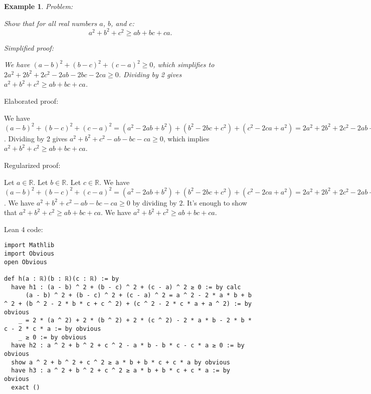 \documentclass{article}
\newtheorem{example}{Example}
\begin{document}
\begin{example}
Problem:
\begin{tcolorbox}[colback=yellow!10, width=\linewidth]
Show that for all real numbers $a$, $b$, and $c$:
    $$a^2 + b^2 + c^2 \geq ab + bc + ca.$$
\end{tcolorbox}

Simplified proof:
\begin{tcolorbox}[colback=blue!10, width=\linewidth]
We have $(a-b)^2 + (b-c)^2 + (c-a)^2 \geq 0$, which simplifies to $2a^2 + 2b^2 + 2c^2 - 2ab - 2bc - 2ca \geq 0$. Dividing by 2 gives $a^2 + b^2 + c^2 \geq ab + bc + ca$.
\end{tcolorbox}
\end{example}

Elaborated proof:
\begin{tcolorbox}[colback=green!10, width=\linewidth]
We have $(a-b)^2 + (b-c)^2 + (c-a)^2 = (a^2 - 2ab + b^2) + (b^2 - 2bc + c^2) + (c^2 - 2ca + a^2) = 2a^2 + 2b^2 + 2c^2 - 2ab - 2bc - 2ca \geq 0$. Dividing by 2 gives $a^2 + b^2 + c^2 - ab - bc - ca \geq 0$, which implies $a^2 + b^2 + c^2 \geq ab + bc + ca$.
\end{tcolorbox}

Regularized proof:
\begin{tcolorbox}[colback=red!10, width=\linewidth]
Let $a\in\mathbb{R}$.
Let $b\in\mathbb{R}$.
Let $c\in\mathbb{R}$.
We have ${{(a-b)}}^2 + {{(b-c)}}^2 + {{(c-a)}}^2 = (a^2 - 2ab + b^2) + (b^2 - 2bc + c^2) + (c^2 - 2ca + a^2) = 2a^2 + 2b^2 + 2c^2 - 2ab - 2bc - 2ca \geq 0$. We have $a^2 + b^2 + c^2 - ab - bc - ca \geq 0$ by dividing by $2$.  It's enough to show that $a^2 + b^2 + c^2 \geq ab + bc + ca$. We have $a^2 + b^2 + c^2 \geq ab + bc + ca$.
\end{tcolorbox}

Lean 4 code:
\begin{tcolorbox}[colback=white!10, width=\linewidth]
\begin{lstlisting}[language=Lean4]
import Mathlib
import Obvious
open Obvious

def h(a : ℝ)(b : ℝ)(c : ℝ) := by
  have h1 : (a - b) ^ 2 + (b - c) ^ 2 + (c - a) ^ 2 ≥ 0 := by calc
      (a - b) ^ 2 + (b - c) ^ 2 + (c - a) ^ 2 = a ^ 2 - 2 * a * b + b ^ 2 + (b ^ 2 - 2 * b * c + c ^ 2) + (c ^ 2 - 2 * c * a + a ^ 2) := by obvious
    _ = 2 * (a ^ 2) + 2 * (b ^ 2) + 2 * (c ^ 2) - 2 * a * b - 2 * b * c - 2 * c * a := by obvious
    _ ≥ 0 := by obvious
  have h2 : a ^ 2 + b ^ 2 + c ^ 2 - a * b - b * c - c * a ≥ 0 := by obvious
  show a ^ 2 + b ^ 2 + c ^ 2 ≥ a * b + b * c + c * a by obvious
  have h3 : a ^ 2 + b ^ 2 + c ^ 2 ≥ a * b + b * c + c * a := by obvious
  exact ()

\end{lstlisting}
\end{tcolorbox}
\end{document}
